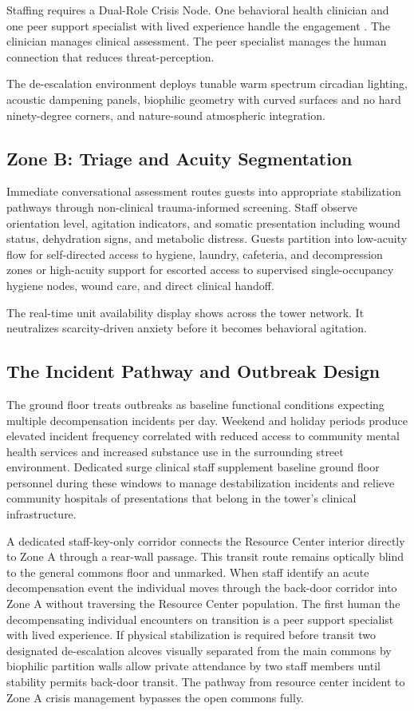 \documentclass[12pt, letterpaper]{article}
\begin{document}
Staffing requires a Dual-Role Crisis Node. One behavioral health clinician and one peer support specialist with lived experience handle the engagement \citep{cit_memphis_model_2023}. The clinician manages clinical assessment. The peer specialist manages the human connection that reduces threat-perception.

The de-escalation environment deploys tunable warm spectrum circadian lighting, acoustic dampening panels, biophilic geometry with curved surfaces and no hard ninety-degree corners, and nature-sound atmospheric integration.

\subsection{Zone B: Triage and Acuity Segmentation}

Immediate conversational assessment routes guests into appropriate stabilization pathways through non-clinical trauma-informed screening. Staff observe orientation level, agitation indicators, and somatic presentation including wound status, dehydration signs, and metabolic distress. Guests partition into low-acuity flow for self-directed access to hygiene, laundry, cafeteria, and decompression zones or high-acuity support for escorted access to supervised single-occupancy hygiene nodes, wound care, and direct clinical handoff.

The real-time unit availability display shows across the tower network. It neutralizes scarcity-driven anxiety before it becomes behavioral agitation.

\subsection{The Incident Pathway and Outbreak Design}

The ground floor treats outbreaks as baseline functional conditions expecting multiple decompensation incidents per day. Weekend and holiday periods produce elevated incident frequency correlated with reduced access to community mental health services and increased substance use in the surrounding street environment. Dedicated surge clinical staff supplement baseline ground floor personnel during these windows to manage destabilization incidents and relieve community hospitals of presentations that belong in the tower's clinical infrastructure.

A dedicated staff-key-only corridor connects the Resource Center interior directly to Zone A through a rear-wall passage. This transit route remains optically blind to the general commons floor and unmarked. When staff identify an acute decompensation event the individual moves through the back-door corridor into Zone A without traversing the Resource Center population. The first human the decompensating individual encounters on transition is a peer support specialist with lived experience. If physical stabilization is required before transit two designated de-escalation alcoves visually separated from the main commons by biophilic partition walls allow private attendance by two staff members until stability permits back-door transit. The pathway from resource center incident to Zone A crisis management bypasses the open commons fully.
\end{document}
